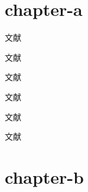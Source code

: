 \documentclass[twoside]{book}
\begin{document}
\chapter{chapter-a}


文献\cite{deverell}

文献\citep{deverell}

\citet{walls}

文献\citep{sommers}

文献\citep{sommersd,sommersc}

文献\citep{walls,sommers,sommersB,deverell}

文献\citep{sommersd,sommersc}




\chapter{chapter-b}

\cite{walls,sommers,sommersB,deverell}

\citet{wfz3,wfz5}

\citep{wfz3,wfz5}

\cite{wfz3}
\cite{wfz5}





    
\end{document}
